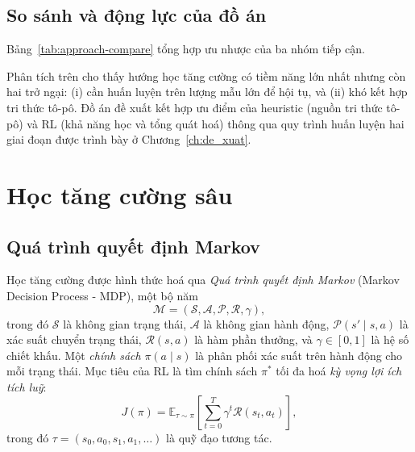 \documentclass[../DoAn.tex]{subfiles}
\begin{document}
\subsection{So sánh và động lực của đồ án}

Bảng~\ref{tab:approach-compare} tổng hợp ưu nhược của ba nhóm tiếp cận.

\begin{table}[h]
\centering
\caption{So sánh ba hướng tiếp cận VNE}
\label{tab:approach-compare}
\end{table}

Phân tích trên cho thấy hướng học tăng cường có tiềm năng lớn nhất nhưng còn hai trở ngại: (i) cần huấn luyện trên lượng mẫu lớn để hội tụ, và (ii) khó kết hợp tri thức tô-pô. Đồ án đề xuất kết hợp ưu điểm của heuristic (nguồn tri thức tô-pô) và RL (khả năng học và tổng quát hoá) thông qua quy trình huấn luyện hai giai đoạn được trình bày ở Chương~\ref{ch:de_xuat}.

\section{Học tăng cường sâu}
\label{sec:rl}

\subsection{Quá trình quyết định Markov}

Học tăng cường được hình thức hoá qua \textit{Quá trình quyết định Markov} (Markov Decision Process - MDP), một bộ năm
\[
    \mathcal{M} = (\mathcal{S}, \mathcal{A}, \mathcal{P}, \mathcal{R}, \gamma),
\]
trong đó $\mathcal{S}$ là không gian trạng thái, $\mathcal{A}$ là không gian hành động, $\mathcal{P}(s' \mid s, a)$ là xác suất chuyển trạng thái, $\mathcal{R}(s, a)$ là hàm phần thưởng, và $\gamma \in [0, 1]$ là hệ số chiết khấu. Một \textit{chính sách} $\pi(a \mid s)$ là phân phối xác suất trên hành động cho mỗi trạng thái. Mục tiêu của RL là tìm chính sách $\pi^*$ tối đa hoá \textit{kỳ vọng lợi ích tích luỹ}\cite{sutton2018rl}:
\begin{equation}
    J(\pi) = \mathbb{E}_{\tau \sim \pi}\left[ \sum_{t=0}^{T} \gamma^t \mathcal{R}(s_t, a_t) \right],
\end{equation}
trong đó $\tau = (s_0, a_0, s_1, a_1, \ldots)$ là quỹ đạo tương tác.
\end{document}
